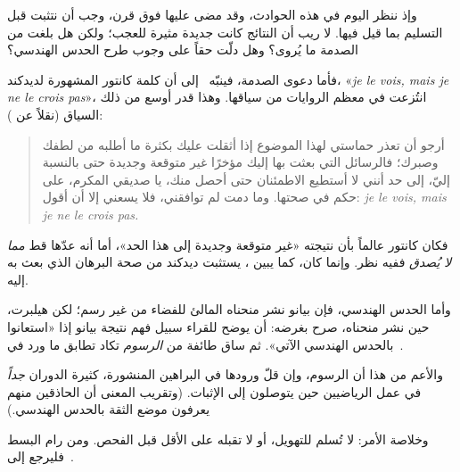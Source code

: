 \documentclass[../../../include/open-logic-section]{subfiles}
\begin{document}


وإذ ننظر اليوم في هذه الحوادث، وقد مضى عليها فوق قرن، وجب أن نتثبت قبل
التسليم بما قيل فيها. لا ريب أن النتائج كانت جديدة مثيرة للعجب؛ ولكن هل
بلغت من الصدمة ما يُروى؟ وهل دلّت حقاً على وجوب طرح الحدس الهندسي؟

فأما دعوى الصدمة، فينبّه~\citet{Gouvea2011} إلى أن كلمة كانتور المشهورة
لديدكند، «\emph{je le vois, mais je ne le crois pas}»، انتُزعت في معظم
الروايات من سياقها. وهذا قدر أوسع من ذلك السياق (نقلاً عن
\citeauthor{Gouvea2011}):
\begin{quote}
أرجو أن تعذر حماستي لهذا الموضوع إذا أثقلت عليك بكثرة ما أطلبه من
لطفك وصبرك؛ فالرسائل التي بعثت بها إليك مؤخرًا غير متوقعة وجديدة حتى
بالنسبة إليّ، إلى حد أنني لا أستطيع الاطمئنان حتى أحصل منك، يا صديقي
المكرم، على حكم في صحتها. وما دمت لم توافقني، فلا يسعني إلا أن أقول:
\emph{je le vois, mais je ne le crois pas.}
\end{quote}
فكان كانتور عالماً بأن نتيجته «غير متوقعة وجديدة إلى هذا الحد»، أما أنه
عدّها قط \emph{مما لا يُصدق} ففيه نظر. وإنما كان، كما يبين
\citeauthor{Gouvea2011}، يستثبت ديدكند من صحة البرهان الذي بعث به إليه.

وأما الحدس الهندسي، فإن بيانو نشر منحناه المالئ للفضاء من غير رسم؛ لكن
هيلبرت، حين نشر منحناه، صرح بغرضه: أن يوضح للقراء سبيل فهم نتيجة بيانو إذا
«استعانوا بالحدس الهندسي الآتي». ثم ساق طائفة من \emph{الرسوم} تكاد تطابق
ما ورد في~.

والأعم من هذا أن الرسوم، وإن قلّ ورودها في البراهين المنشورة، كثيرة الدوران
\emph{جداً} في عمل الرياضيين حين يتوصلون إلى الإثبات. (وتقريب المعنى أن
الحاذقين منهم يعرفون موضع الثقة بالحدس الهندسي.)

وخلاصة الأمر: لا تُسلم للتهويل، أو لا تقبله على الأقل قبل الفحص. ومن رام
البسط فليرجع إلى~\citet{Giaquinto2007}.
\end{document}
